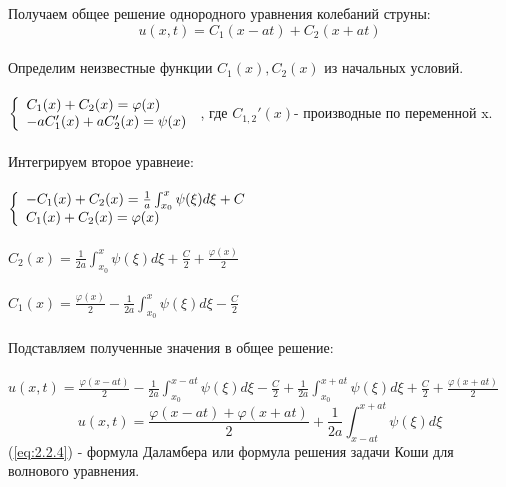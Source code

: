 \documentclass[../main.tex]{subfiles}
\begin{document}
Получаем общее решение однородного уравнения колебаний струны:\\
\[u(x,t)=C_1(x-at)+C_2(x+at)\]\\
Определим неизвестные функции $C_1(x), C_2(x)$ из начальных условий.\\\\
$
\begin{left}
\{
\begin{array}{lcl}
 C_{1}(x)+C_2(x)=\varphi(x)\\
-aC_1'(x)+aC_2'(x)=\psi(x)\\
\end{array}
\right.
\end{left}
$
, где $C_{1,2}'(x)$- производные по переменной x.\\
\\Интегрируем второе уравнеие:\\\\
$
\begin{left}
\{
\begin{array}{lcl}
-C_1(x)+C_2(x)=\frac{1}{a}\int_{x_0}^x\psi(\xi)d\xi+C\\
C_1(x)+C_2(x)=\varphi(x)\\
\end{array}
\right.
\end{left}
$
\\\\
$C_2(x)=\frac{1}{2a}\int_{x_0}^x\psi(\xi)d\xi+\frac{C}{2}+\frac{\varphi(x)}{2}$\\\\
$C_1(x)=\frac{\varphi(x)}{2}-\frac{1}{2a}\int_{x_0}^x\psi(\xi)d\xi-\frac{C}{2}$\\\\
Подставляем полученные значения в общее решение:\\\\
$u(x,t)=\frac{\varphi(x-at)}{2}-\frac{1}{2a}\int_{x_0}^{x-at}\psi(\xi)d\xi-\frac{C}{2}+\frac{1}{2a}\int_{x_0}^{x+at}\psi(\xi)d\xi+\frac{C}{2}+\frac{\varphi(x+at)}{2}$
\begin{equation}\label{eq:2.2.4}
u(x,t)=\frac{\varphi(x-at)+\varphi(x+at)}{2}+\frac{1}{2a}\int_{x-at}^{x+at}\psi(\xi)d\xi
\end{equation}
(\ref{eq:2.2.4}) - формула Даламбера или формула решения задачи Коши для волнового уравнения.
\end{document}
